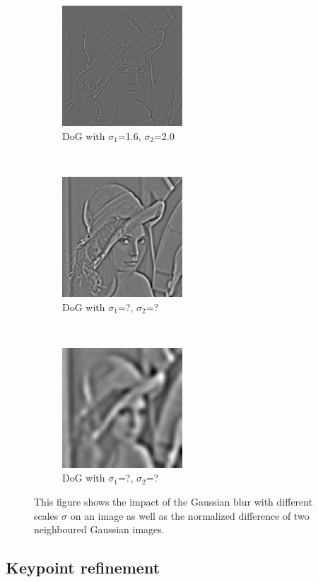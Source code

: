 \documentclass{article}
\begin{document}
\begin{figure}[ht]
\begin{center}
			\begin{subfigure}[normla]{0.3\textwidth}
				\includegraphics[width=4.5cm]{images/DoG_at_sigma_2.png}
				\caption{DoG with $\sigma_1$=1.6, $\sigma_2$=2.0}
				\label{subfig:org}
			\end{subfigure}
			~
			\begin{subfigure}[normla]{0.3\textwidth}
				\includegraphics[width=4.5cm]{images/DoG_at_sigma_5.png}
				\caption{DoG with $\sigma_1$=?, $\sigma_2$=?}
				\label{subfig:org}
			\end{subfigure}
			~
			\begin{subfigure}[normla]{0.3\textwidth}		
				\includegraphics[width=4.5cm]{images/DoG_at_sigma_13.png}
				\caption{DoG with $\sigma_1$=?, $\sigma_2$=?}
				\label{subfig:org}
			\end{subfigure}
		\caption{This figure shows the impact of the Gaussian blur with different scales $\sigma$ on an image as well as the normalized difference of two neighboured Gaussian images.}
		\end{center}
	\end{figure}
	
	\subsection{Keypoint refinement}
	
\end{document}
